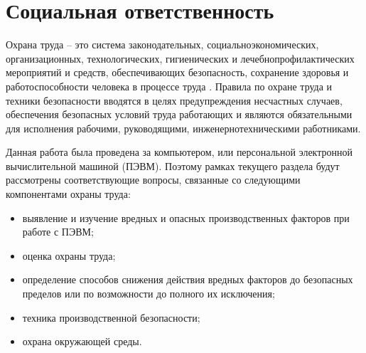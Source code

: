 \section{Социальная ответственность}
\label{section:socialResp}


Охрана труда -- это система законодательных, социально\-экономических, организационных, технологических, гигиенических и лечебно\-профилактических мероприятий и средств, обеспечивающих безопасность, сохранение здоровья и работоспособности человека в процессе труда \cite{Osah2016}.
Правила по охране труда и техники безопасности вводятся в целях предупреждения несчастных случаев, обеспечения безопасных условий труда работающих и являются обязательными для исполнения рабочими, руководящими, инженерно\-техническими работниками.



Данная работа была проведена за компьютером, или персональной электронной вычислительной машиной (ПЭВМ).
Поэтому рамках текущего раздела будут рассмотрены соответствующие вопросы, связанные со следующими компонентами охраны труда:

\begin{itemize}
    \item выявление и изучение вредных и опасных производственных факторов при работе с ПЭВМ;
    \item оценка охраны труда;
    \item определение способов снижения действия вредных факторов до безопасных пределов или по возможности до полного их исключения;
    \item техника производственной безопасности;
    \item охрана окружающей среды.
\end{itemize}


